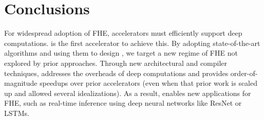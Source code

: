 \chapter{Conclusions}\label{sec:conclusion}

For widespread adoption of FHE, accelerators must efficiently support deep computations.
\name is the first accelerator to achieve this.
By adopting state-of-the-art algorithms and using them to design \name,
we target a new regime of FHE not explored by prior approaches.
Through new architectural and compiler techniques, \name addresses the overheads
of deep computations and provides order-of-magnitude speedups over prior accelerators
(even when that prior work is scaled up and allowed several idealizations).
As a result, \name enables new applications for FHE, such as real-time inference
using deep neural networks like ResNet or LSTMs.



